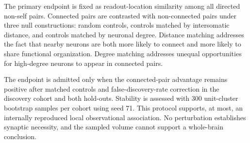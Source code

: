 The primary endpoint is fixed as readout-location similarity among all directed
non-self pairs. Connected pairs are contrasted with non-connected pairs under
three null constructions: random controls, controls matched by intersomatic
distance, and controls matched by neuronal degree. Distance matching addresses
the fact that nearby neurons are both more likely to connect and more likely to
share functional organization. Degree matching addresses unequal opportunities
for high-degree neurons to appear in connected pairs.

The endpoint is admitted only when the connected-pair advantage remains
positive after matched controls and false-discovery-rate correction in the
discovery cohort and both hold-outs. Stability is assessed with 300 unit-cluster
bootstrap samples per cohort using seed 71. This protocol supports, at most, an
internally reproduced local observational association. No perturbation establishes synaptic
necessity, and the sampled volume cannot support a whole-brain conclusion.
